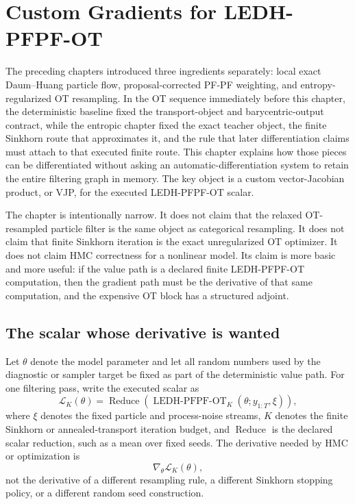 \chapter{Custom Gradients for LEDH-PFPF-OT}
\label{ch:bf-ledh-pfpf-ot-custom-gradient}

The preceding chapters introduced three ingredients separately: local exact
Daum--Huang particle flow, proposal-corrected PF-PF weighting, and
entropy-regularized OT resampling.  In the OT sequence immediately before this
chapter, the deterministic baseline fixed the transport-object and barycentric-output
contract, while the entropic chapter fixed the exact teacher object, the finite
Sinkhorn route that approximates it, and the rule that later differentiation claims
must attach to that executed finite route.  This chapter explains how those pieces can
be differentiated without asking an automatic-differentiation system to retain
the entire filtering graph in memory.  The key object is a custom
vector-Jacobian product, or VJP, for the executed LEDH-PFPF-OT scalar.

The chapter is intentionally narrow.  It does not claim that the relaxed
OT-resampled particle filter is the same object as categorical resampling.  It
does not claim that finite Sinkhorn iteration is the exact unregularized OT
optimizer.  It does not claim HMC correctness for a nonlinear model.  Its claim
is more basic and more useful: if the value path is a declared finite
LEDH-PFPF-OT computation, then the gradient path must be the derivative of that
same computation, and the expensive OT block has a structured adjoint.

\section{The scalar whose derivative is wanted}
\label{sec:bf-ledh-ot-scalar}

Let $\theta$ denote the model parameter and let all random numbers used by the
diagnostic or sampler target be fixed as part of the deterministic value path.
For one filtering pass, write the executed scalar as
\begin{equation}
\label{eq:bf-ledh-ot-executed-scalar}
  \mathcal L_K(\theta)
  =
  \operatorname{Reduce}
  \left(
    \operatorname{LEDH\mbox{-}PFPF\mbox{-}OT}_K
    (\theta; y_{1:T}, \xi)
  \right),
\end{equation}
where $\xi$ denotes the fixed particle and process-noise streams, $K$ denotes
the finite Sinkhorn or annealed-transport iteration budget, and
\(\operatorname{Reduce}\) is the declared scalar reduction, such as a mean over
fixed seeds.  The derivative needed by HMC or optimization is
\[
  \nabla_\theta \mathcal L_K(\theta),
\]
not the derivative of a different resampling rule, a different Sinkhorn stopping
policy, or a different random seed construction.

